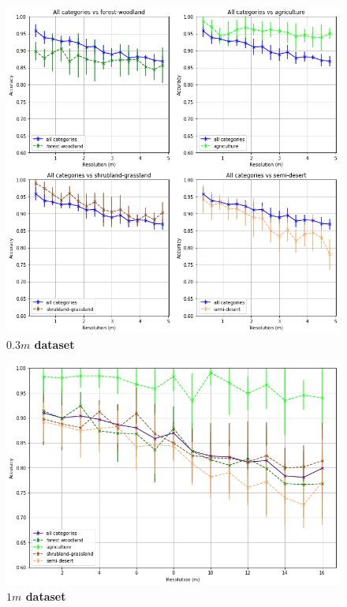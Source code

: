 \begin{figure}[h!]
	\centering
	\includegraphics[width=\textwidth]{Figures/results/acc_res_by_category_03m.png}
	\captionsetup{width=1\linewidth}
	\caption{\textbf{$0.3m$ dataset}}
	\label{fig:acc_by_cat_03m}
\end{figure}


\begin{figure}[h!]
	\centering
	\includegraphics[width=\textwidth]{Figures/results/acc_res_all_categories_1m.png}
	\captionsetup{width=1\linewidth}
	\caption{\textbf{$1m$ dataset}}
	\label{fig:acc_all_cat_1m}
\end{figure}

